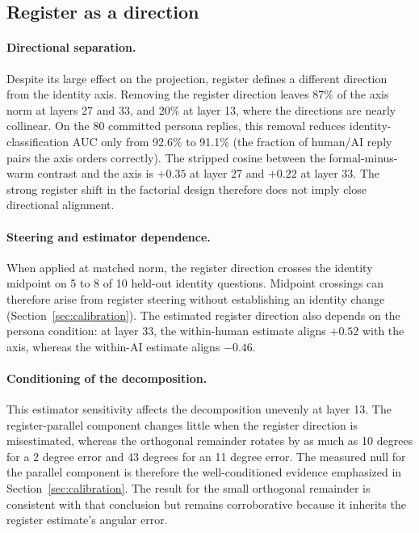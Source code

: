 \subsection{Register as a direction}

\paragraph{Directional separation.}
Despite its large effect on the projection, register defines a different
direction from the identity axis. Removing the register direction leaves 87\%
of the axis norm at layers 27 and 33, and 20\% at layer 13, where the directions
are nearly collinear. On the 80 committed persona replies, this removal reduces
identity-classification AUC only from 92.6\% to 91.1\% (the fraction of
human/AI reply pairs the axis orders correctly). The stripped cosine between the
formal-minus-warm contrast and the axis is $+0.35$ at layer 27 and $+0.22$ at
layer 33. The strong register shift in the factorial design therefore does not
imply close directional alignment.

\paragraph{Steering and estimator dependence.}
When applied at matched norm, the register direction crosses the identity
midpoint on 5 to 8 of 10 held-out identity questions. Midpoint crossings can
therefore arise from register steering without establishing an identity change
(Section~\ref{sec:calibration}). The estimated register direction also depends
on the persona condition: at layer 33, the within-human estimate aligns $+0.52$
with the axis, whereas the within-AI estimate aligns $-0.46$.

\paragraph{Conditioning of the decomposition.}
This estimator sensitivity affects the decomposition unevenly at layer 13.
The register-parallel component changes little when the register direction is
misestimated, whereas the orthogonal remainder rotates by as much as 10 degrees
for a 2 degree error and 43 degrees for an 11 degree error. The measured null for
the parallel component is therefore the well-conditioned evidence emphasized in
Section~\ref{sec:calibration}. The result for the small orthogonal remainder is
consistent with that conclusion but remains corroborative because it inherits
the register estimate's angular error.

